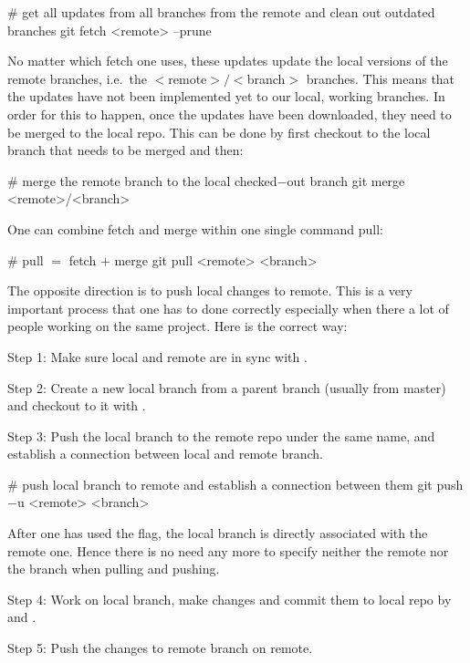 \begin{bash}
# get all updates from all branches from the remote and clean out outdated branches
git fetch <remote> --prune
\end{bash}

No matter which fetch one uses, these updates update the local versions of the remote branches, i.e.\ the
$<$remote$>/<$branch$>$ branches. This means that the updates have not been implemented yet to our local, working
branches. In order for this to happen, once the updates have been downloaded, they need to be merged to the local
repo. This can be done by first checkout to the local branch that needs to be merged and then:

\begin{bash}
# merge the remote branch to the local checked$-$out branch
git merge <remote>/<branch>
\end{bash}

One can combine fetch and merge within one single command pull:

\begin{bash}
# pull $=$ fetch $+$ merge
git pull <remote> <branch>
\end{bash}

The opposite direction is to push local changes to remote. This is a very important process that one has to done
correctly especially when there a lot of people working on the same project. Here is the correct way:
\bit
\item Step 1: Make sure local and remote are in sync with .
\item Step 2: Create a new local branch from a parent branch (usually from master) and checkout to it with .
\item Step 3: Push the local branch to the remote repo under the same name, and establish a connection between local and
remote branch.

\begin{bash}
# push local branch to remote and establish a connection between them
git push $-$u <remote> <branch>
\end{bash}

After one has used the  flag, the local branch is directly associated with the remote one. Hence there is
no need any more to specify neither the remote nor the branch when pulling and pushing.
\item Step 4: Work on local branch, make changes and commit them to local repo by  and .
\item Step 5: Push the changes to remote branch on remote.

